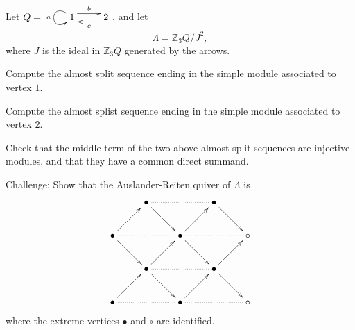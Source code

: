 \documentclass[a4paper]{amsart}
\begin{document}

\begin{Exercise}[title={Almost split sequences}]
Let $Q=\xymatrix{ 1\ar@(ul,dl)_a \ar@<1ex>[r]^b &
  2\ar@<1ex>[l]^c }$, and let 
\[\Lambda = \mathbb{Z}_3Q/J^2,\] 
where $J$ is the ideal in $\mathbb{Z}_3Q$ generated by the
arrows. 

\Question Compute the almost split sequence ending in the simple
module associated to vertex $1$.

\Question Compute the almost splist sequence ending in the simple
module associated to vertex $2$. 

\Question Check that the middle term of the two above almost split
sequences are injective modules, and that they have a common direct
summand. 

\Question Challenge: Show that the Auslander-Reiten quiver of $\Lambda$ is 
\[\xymatrix{
 & \bullet\ar@{..}[rr]\ar[dr] &         & \bullet\ar[dr] & \\
\bullet \ar@{..}[rr]\ar[ur]\ar[dr] & & \bullet \ar@{..}[rr]\ar[ur]\ar[dr] && \circ \\
 & \bullet\ar@{..}[rr]\ar[ur]\ar[dr] &         & \bullet \ar[ur]\ar[dr] & \\
\bullet\ar@{..}[rr]\ar[ur] & & \bullet \ar@{..}[rr]\ar[ur] && \circ 
}\]
where the extreme vertices $\bullet$ and $\circ$ are identified. 
\end{Exercise}
\end{document}
